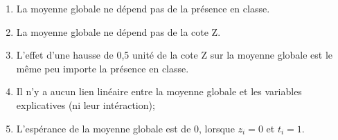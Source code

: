 \begin{questions}
\begin{parts}
\begin{enumerate}
    \item La moyenne globale ne dépend pas de la présence en classe.
    \item La moyenne globale ne dépend pas de la cote Z.
    \item L'effet d'une hausse de 0,5 unité de la cote Z sur la moyenne globale est le même peu importe la présence en classe. 
    \item Il n'y a aucun lien linéaire entre la moyenne globale et les variables explicatives (ni leur intéraction); 
    \item L'espérance de la moyenne globale est de $0$, lorsque $z_i=0$ et $t_i=1$.
\end{enumerate}

\medskip\medskip


\end{parts}
\end{questions}
